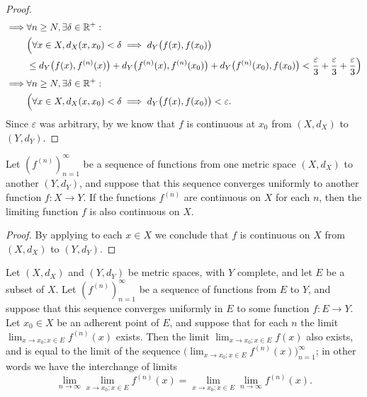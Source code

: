 \begin{proof}
\begin{align*}
    \implies & \forall n \geq N, \exists \delta \in \mathbb{R}^+ :                                                                                                                                                    \\
             & \Big(\forall x \in X, d_X(x, x_0) < \delta \implies d_Y\big(f(x), f(x_0)\big)                                                                                                                  \\
             & \leq d_Y\big(f(x), f^{(n)}(x)\big) + d_Y\big(f^{(n)}(x), f^{(n)}(x_0)\big) + d_Y\big(f^{(n)}(x_0), f(x_0)\big) < \dfrac{\varepsilon}{3} + \dfrac{\varepsilon}{3} + \dfrac{\varepsilon}{3}\Big) \\
    \implies & \forall n \geq N, \exists \delta \in \mathbb{R}^+ :                                                                                                                                                    \\
             & \Big(\forall x \in X, d_X(x, x_0) < \delta \implies d_Y\big(f(x), f(x_0)\big) < \varepsilon.
  \end{align*}
  Since \(\varepsilon\) was arbitrary, by  we know that \(f\) is continuous at \(x_0\) from \((X, d_X)\) to \((Y, d_Y)\).
\end{proof}

\begin{cor}\label{ii:3.3.2}
  Let \((f^{(n)})_{n = 1}^\infty\) be a sequence of functions from one metric space \((X, d_X)\) to another \((Y, d_Y)\), and suppose that this sequence converges uniformly to another function \(f : X \to Y\).
  If the functions \(f^{(n)}\) are continuous on \(X\) for each \(n\), then the limiting function \(f\) is also continuous on \(X\).
\end{cor}

\begin{proof}
  By applying  to each \(x \in X\) we conclude that \(f\) is continuous on \(X\) from \((X, d_X)\) to \((Y, d_Y)\).
\end{proof}

\begin{prop}\label{ii:3.3.3}
  Let
  \((X, d_X)\) and \((Y, d_Y)\) be metric spaces, with \(Y\) complete, and let \(E\) be a subset of \(X\).
  Let \((f^{(n)})_{n = 1}^\infty\) be a sequence of functions from \(E\) to \(Y\), and suppose that this sequence converges uniformly in \(E\) to some function \(f : E \to Y\).
  Let \(x_0 \in X\) be an adherent point of \(E\), and suppose that for each \(n\) the limit \(\lim_{x \to x_0 ; x \in E} f^{(n)}(x)\) exists.
  Then the limit \(\lim_{x \to x_0 ; x \in E} f(x)\) also exists, and is equal to the limit of the sequence \(\big(\lim_{x \to x_0 ; x \in E} f^{(n)}(x)\big)_{n = 1}^\infty\);
  in other words we have the interchange of limits
  \[
    \lim_{n \to \infty} \lim_{x \to x_0 ; x \in E} f^{(n)}(x) = \lim_{x \to x_0 ; x \in E} \lim_{n \to \infty} f^{(n)}(x).
  \]
\end{prop}

